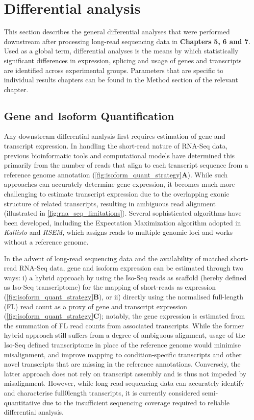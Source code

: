 \section{Differential analysis}

This section describes the general differential analyses that were performed downstream after processing long-read sequencing data in \textbf{Chapters 5, 6 and 7}. Used as a global term, differential analyses is the means by which statistically significant differences in expression, splicing and usage of genes and transcripts are identified across experimental groups. Parameters that are specific to individual results chapters can be found in the Method section of the relevant chapter. 

\subsection{Gene and Isoform Quantification}
Any downstream differential analysis first requires estimation of gene and transcript expression. In handling the short-read nature of RNA-Seq data, previous bioinformatic tools and computational models have determined this primarily from the number of reads that align to each transcript sequence from a reference genome annotation\cite{Conesa2016} (\cref{fig:isoform_quant_strategy}\textbf{A}). While such approaches can accurately determine gene expression, it becomes much more challenging to estimate transcript expression due to the overlapping exonic structure of related transcripts, resulting in ambiguous read alignment (illustrated in \cref{fig:rna_seq_limitations}). Several sophisticated algorithms have been developed, including the Expectation Maximization algorithm adopted in \textit{Kallisto} and \textit{RSEM}, which assigns reads to multiple genomic loci and works without a reference genome\cite{Conesa2016}. 

In the advent of long-read sequencing data and the availability of matched short-read RNA-Seq data, gene and isoform expression can be estimated through two ways: i) a hybrid approach by using the Iso-Seq reads as scaffold (hereby defined as Iso-Seq transcriptome) for the mapping of short-reads as expression (\cref{fig:isoform_quant_strategy}\textbf{B}), or ii) directly using the normalised full-length (FL) read count as a proxy of gene and transcript expression (\cref{fig:isoform_quant_strategy}\textbf{C}); notably, the gene expression is estimated from the summation of FL read counts from associated transcripts. While the former hybrid approach still suffers from a degree of ambiguous alignment, usage of the Iso-Seq defined transcriptome in place of the reference genome would minimise misalignment, and improve mapping to condition-specific transcripts and other novel transcripts that are missing in the reference annotations\cite{Au2013}. Conversely, the latter approach does not rely on transcript assembly and is thus not impeded by misalignment. However, while long-read sequencing data can accurately identify and characterise full0length transcripts, it is currently considered semi-quantitative due to the insufficient sequencing coverage required to reliable differential analysis. 

